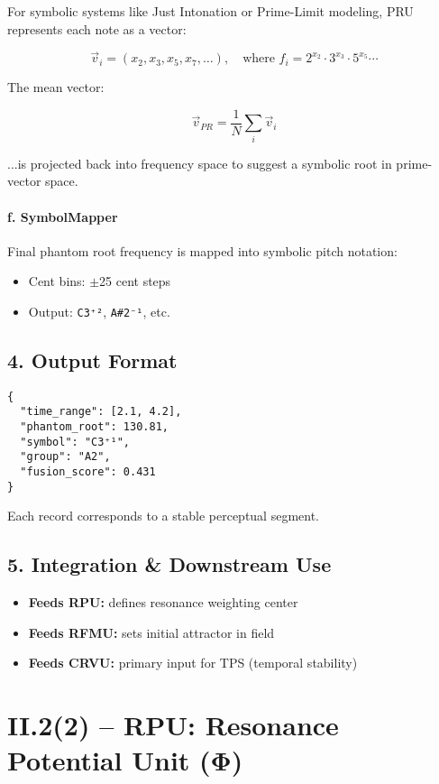 \documentclass{article}
\begin{document}
For symbolic systems like Just Intonation or Prime-Limit modeling, PRU represents each note as a vector:

\[
\vec{v}_i = (x_2, x_3, x_5, x_7, \ldots), \quad \text{where } f_i = 2^{x_2} \cdot 3^{x_3} \cdot 5^{x_5} \cdots
\]

The mean vector:

\[
\vec{v}_{PR} = \frac{1}{N} \sum_i \vec{v}_i
\]

...is projected back into frequency space to suggest a symbolic root in prime-vector space.

\paragraph{f. SymbolMapper}

Final phantom root frequency is mapped into symbolic pitch notation:

\begin{itemize}
    \item Cent bins: $\pm$25 cent steps
    \item Output: \texttt{C3⁺²}, \texttt{A\#2⁻¹}, etc.
\end{itemize}

\subsection*{4. Output Format}

\begin{verbatim}
{
  "time_range": [2.1, 4.2],
  "phantom_root": 130.81,
  "symbol": "C3⁺¹",
  "group": "A2",
  "fusion_score": 0.431
}
\end{verbatim}

Each record corresponds to a stable perceptual segment.

\subsection*{5. Integration & Downstream Use}

\begin{itemize}
    \item \textbf{Feeds RPU:} defines resonance weighting center
    \item \textbf{Feeds RFMU:} sets initial attractor in field
    \item \textbf{Feeds CRVU:} primary input for TPS (temporal stability)
\end{itemize}

\section*{II.2(2) – RPU: Resonance Potential Unit (Φ)}
\end{document}

